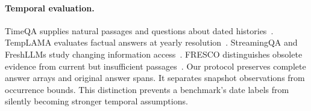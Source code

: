 \paragraph{Temporal evaluation.}
TimeQA supplies natural passages and questions about dated histories~\citep{chen2021timeqa}.
TempLAMA evaluates factual answers at yearly resolution~\citep{dhingra2022templama}.
StreamingQA and FreshLLMs study changing information access~\citep{liska2022streamingqa,vu2024freshllms}.
FRESCO distinguishes obsolete evidence from current but insufficient passages~\citep{an2026fresco}.
Our protocol preserves complete answer arrays and original answer spans.
It separates snapshot observations from occurrence bounds.
This distinction prevents a benchmark's date labels from silently becoming stronger temporal assumptions.

